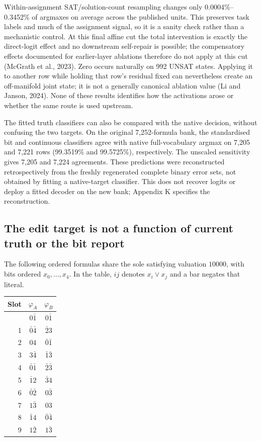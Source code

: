 \documentclass[
  british,
  11pt,
  a4paper,
]{article}
\newcounter{none} %
\begin{document}
Within-assignment SAT/solution-count resampling changes only
0.0004\%--0.3452\% of argmaxes on average across the published units.
This preserves task labels and much of the assignment signal, so it is a
sanity check rather than a mechanistic control. At this final affine cut
the total intervention is exactly the direct-logit effect and no
downstream self-repair is possible; the compensatory effects documented
for earlier-layer ablations therefore do not apply at this cut (McGrath
et al., 2023). Zero occurs naturally on 992 UNSAT states. Applying it to
another row while holding that row's residual fixed can nevertheless
create an off-manifold joint state; it is not a generally canonical
ablation value (Li and Janson, 2024). None of these results identifies
how the activations arose or whether the same route is used upstream.

The fitted truth classifiers can also be compared with the native
decision, without confusing the two targets. On the original
7,252-formula bank, the standardised bit and continuous classifiers
agree with native full-vocabulary argmax on 7,205 and 7,221 rows
(99.3519\% and 99.5725\%), respectively. The unscaled sensitivity gives
7,205 and 7,224 agreements. These predictions were reconstructed
retrospectively from the freshly regenerated complete binary error sets,
not obtained by fitting a native-target classifier. This does not
recover logits or deploy a fitted decoder on the new bank; Appendix K
specifies the reconstruction.

\subsection{The edit target is not a function of current truth or the
bit
report}\label{the-edit-target-is-not-a-function-of-current-truth-or-the-bit-report}

The following ordered formulas share the sole satisfying valuation
\(10000\), with bits ordered \(x_0,\ldots,x_4\). In the table, \(ij\)
denotes \(x_i\lor x_j\) and a bar negates that literal.

{\def\LTcaptype{none} %
\begin{longtable}[]{@{}rcc@{}}
\toprule\noalign{}
Slot & \(\varphi_A\) & \(\varphi_B\) \\
\midrule\noalign{}
\endhead
\bottomrule\noalign{}
\endlastfoot
0 & \(0\bar1\) & \(0\bar1\) \\
1 & \(\bar0\bar4\) & \(\bar2 3\) \\
2 & \(04\) & \(\bar0\bar1\) \\
3 & \(3\bar4\) & \(\bar1\bar3\) \\
4 & \(\bar0\bar1\) & \(\bar2\bar3\) \\
5 & \(\bar1 2\) & \(\bar3 4\) \\
6 & \(\bar0\bar2\) & \(0\bar3\) \\
7 & \(1\bar3\) & \(03\) \\
8 & \(\bar1 4\) & \(\bar0\bar4\) \\
9 & \(1\bar2\) & \(1\bar3\) \\
\end{longtable}
}
\end{document}
